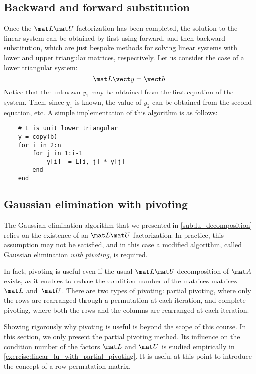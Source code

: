 \subsection{Backward and forward substitution}%
\label{sub:backward_and_forward_substitution}
Once the $\mat L \mat U$ factorization has been completed,
the solution to the linear system can be obtained by first using forward, and then backward substitution,
which are just bespoke methods for solving linear systems with lower and upper triangular matrices, respectively.
Let us consider the case of a lower triangular system:
\[
    \mat L \vect y = \vect b
\]
Notice that the unknown $y_1$ may be obtained from the first equation of the system.
Then, since $y_1$ is known, the value of $y_2$ can be obtained from the second equation, etc.
A simple implementation of this algorithm is as follows:
\begin{verbatim}
    # L is unit lower triangular
    y = copy(b)
    for i in 2:n
        for j in 1:i-1
            y[i] -= L[i, j] * y[j]
        end
    end
\end{verbatim}

\subsection{Gaussian elimination with pivoting~\moreinfo}%
\label{sub:pivoting}
The Gaussian elimination algorithm that
we presented in \cref{sub:lu_decomposition} relies on the existence of an $\mat L \mat U$ factorization.
In practice,
this assumption may not be satisfied,
and in this case a modified algorithm,
called Gaussian elimination \emph{with pivoting},
is required.

In fact, pivoting is useful even if the usual $\mat L \mat U$ decomposition of $\mat A$ exists,
as it enables to reduce the condition number of the matrices matrices~$\mat L$ and~$\mat U$.
There are two types of pivoting:
partial pivoting, where only the rows are rearranged through a permutation at each iteration,
and complete pivoting, where both the rows and the columns are rearranged at each iteration.

Showing rigorously why pivoting is useful is beyond the scope of this course.
In this section, we only present the partial pivoting method.
Its influence on the condition number of the factors $\mat L$ and $\mat U$ is studied empirically in \cref{exercise:linear_lu_with_partial_pivoting}.
It is useful at this point to introduce the concept of a row permutation matrix.

